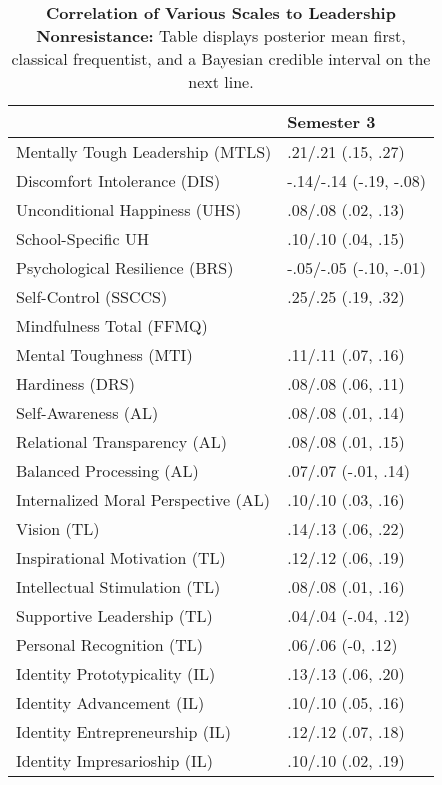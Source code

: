 \begin{table}[ht]
\centering
\begin{tabular}{ll}
  \hline
 & Semester 3 \\ 
  \hline
Mentally Tough Leadership (MTLS) & .21/.21 (.15, .27) \\ 
  Discomfort Intolerance (DIS) & -.14/-.14 (-.19, -.08) \\ 
  Unconditional Happiness (UHS) & .08/.08 (.02, .13) \\ 
  School-Specific UH & .10/.10 (.04, .15) \\ 
  Psychological Resilience (BRS) & -.05/-.05 (-.10, -.01) \\ 
  Self-Control (SSCCS) & .25/.25 (.19, .32) \\ 
  Mindfulness Total (FFMQ) &  \\ 
  Mental Toughness (MTI) & .11/.11 (.07, .16) \\ 
  Hardiness (DRS) & .08/.08 (.06, .11) \\ 
  Self-Awareness (AL) & .08/.08 (.01, .14) \\ 
  Relational Transparency (AL) & .08/.08 (.01, .15) \\ 
  Balanced Processing (AL) & .07/.07 (-.01, .14) \\ 
  Internalized Moral Perspective (AL) & .10/.10 (.03, .16) \\ 
  Vision (TL) & .14/.13 (.06, .22) \\ 
  Inspirational Motivation (TL) & .12/.12 (.06, .19) \\ 
  Intellectual Stimulation (TL) & .08/.08 (.01, .16) \\ 
  Supportive Leadership (TL) & .04/.04 (-.04, .12) \\ 
  Personal Recognition (TL) & .06/.06 (-0, .12) \\ 
  Identity Prototypicality (IL) & .13/.13 (.06, .20) \\ 
  Identity Advancement (IL) & .10/.10 (.05, .16) \\ 
  Identity Entrepreneurship (IL) & .12/.12 (.07, .18) \\ 
  Identity Impresarioship (IL) & .10/.10 (.02, .19) \\ 
   \hline
\end{tabular}
\caption{\textbf{Correlation of Various Scales to Leadership Nonresistance:} Table displays posterior mean first, classical frequentist, and a Bayesian credible interval on the next line.} 
\label{tab:lnr_corr}
\end{table}
